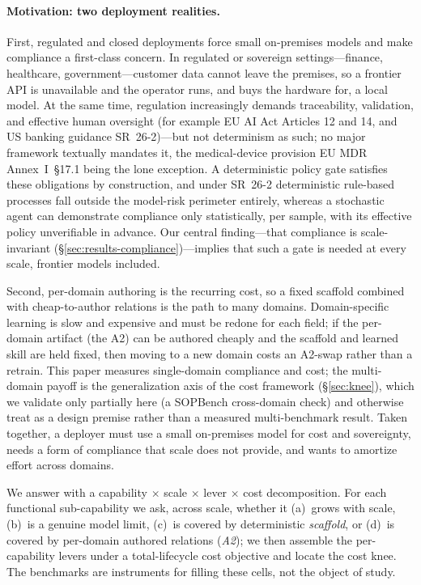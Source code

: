 \paragraph{Motivation: two deployment realities.}%
First, regulated and closed deployments force small on-premises models and make compliance a first-class concern. In regulated or sovereign settings---finance, healthcare, government---customer data cannot leave the premises, so a frontier API is unavailable and the operator runs, and buys the hardware for, a local model. At the same time, regulation increasingly demands traceability, validation, and effective human oversight (for example EU AI Act Articles 12 and 14, and US banking guidance SR~26-2)---but not determinism as such; no major framework textually mandates it, the medical-device provision EU MDR Annex~I~\S17.1 being the lone exception. A deterministic policy gate satisfies these obligations by construction, and under SR~26-2 deterministic rule-based processes fall outside the model-risk perimeter entirely, whereas a stochastic agent can demonstrate compliance only statistically, per sample, with its effective policy unverifiable in advance. Our central finding---that compliance is scale-invariant (\S\ref{sec:results-compliance})---implies that such a gate is needed at every scale, frontier models included.

Second, per-domain authoring is the recurring cost, so a fixed scaffold combined with cheap-to-author relations is the path to many domains. Domain-specific learning is slow and expensive and must be redone for each field; if the per-domain artifact (the A2) can be authored cheaply and the scaffold and learned skill are held fixed, then moving to a new domain costs an A2-swap rather than a retrain. This paper measures single-domain compliance and cost; the multi-domain payoff is the generalization axis of the cost framework (\S\ref{sec:knee}), which we validate only partially here (a SOPBench cross-domain check) and otherwise treat as a design premise rather than a measured multi-benchmark result. Taken together, a deployer must use a small on-premises model for cost and sovereignty, needs a form of compliance that scale does not provide, and wants to amortize effort across domains.

We answer with a capability $\times$ scale $\times$ lever $\times$ cost decomposition. For each functional sub-capability we ask, across scale, whether it (a)~grows with scale, (b)~is a genuine model limit, (c)~is covered by deterministic \emph{scaffold}, or (d)~is covered by per-domain authored relations (\emph{A2}); we then assemble the per-capability levers under a total-lifecycle cost objective and locate the cost knee. The benchmarks are instruments for filling these cells, not the object of study.

